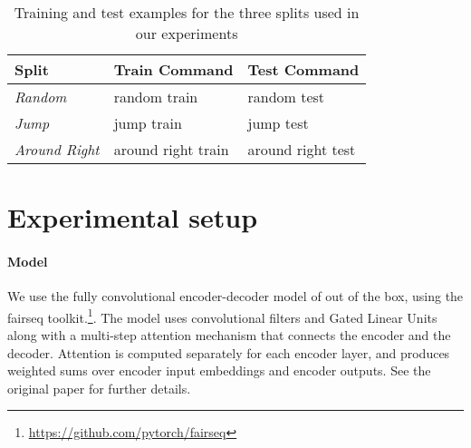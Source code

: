 \begin{table*}[t!]
\footnotesize
\centering
\begin{tabular}{| l | l | l |}
\hline \textbf{Split} & \textbf{Train Command} & \textbf{Test Command} \\ \hline
\textit{Random} & random train & random test \\
\hline
\textit{Jump} & jump train & jump test \\
\hline
\textit{Around Right} & around right train & around right test \\
\hline
\end{tabular}
\caption{\label{table:examples}  Training and test examples for the three splits used in our experiments }
\end{table*}




\section{Experimental setup}
\paragraph{Model} We use the fully convolutional encoder-decoder model
of  out of the box, using the fairseq 
toolkit.\footnote{\url{https://github.com/pytorch/fairseq}}. The model
uses convolutional filters and Gated Linear Units
\cite{dauphin:etal:2016} along with a multi-step attention mechanism
that connects the encoder and the decoder.  Attention is computed
separately for each encoder layer, and produces weighted sums over
encoder input embeddings and encoder outputs. See the original paper
for further details.

